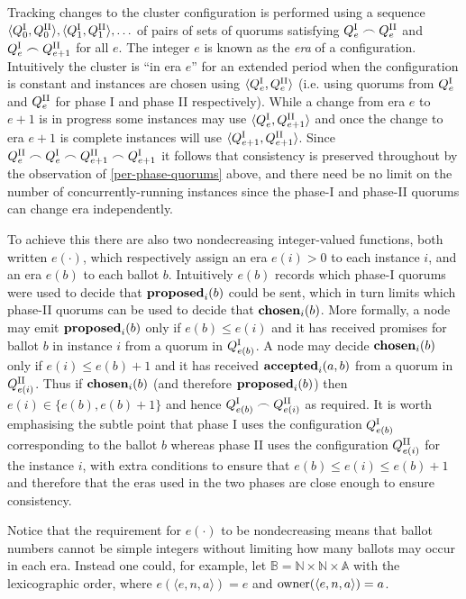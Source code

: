 \documentclass[journal]{IEEEtran}
\begin{document}
Tracking changes to the cluster configuration is performed using a sequence
$\langle {Q}^\textrm{I}_{0}, {Q}^\textrm{II}_{0} \rangle, \langle {Q}^\textrm{I}_{1}, {Q}^\textrm{II}_{1} \rangle, \ldots$ of
pairs of sets of quorums satisfying ${Q}^\textrm{I}_{e} \frown {Q}^\textrm{II}_{e}$ and ${Q}^\textrm{I}_{e} \frown
{Q}^\textrm{II}_{e+1}$ for all $e$. The integer $e$ is known as the \textit{era} of a
configuration. Intuitively the cluster is ``in era $e$'' for an extended period
when the configuration is constant and instances are chosen using $\langle
{Q}^\textrm{I}_{e}, {Q}^\textrm{II}_{e}\rangle$ (i.e. using quorums from ${Q}^\textrm{I}_{e}$ and ${Q}^\textrm{II}_{e}$ for
phase I and phase II respectively). While a change from era $e$ to $e+1$ is in
progress some instances may use $\langle {Q}^\textrm{I}_{e}, {Q}^\textrm{II}_{e+1} \rangle$ and once
the change to era $e+1$ is complete instances will use $\langle {Q}^\textrm{I}_{e+1},
{Q}^\textrm{II}_{e+1} \rangle$. Since ${Q}^\textrm{II}_{e} \frown {Q}^\textrm{I}_{e} \frown {Q}^\textrm{II}_{e+1} \frown
{Q}^\textrm{I}_{e+1}$ it follows that consistency is preserved throughout by the
observation of \ref{per-phase-quorums} above, and there need be no limit on the
number of concurrently-running instances since the phase-I and phase-II quorums
can change era independently.

To achieve this there are also two nondecreasing integer-valued functions, both
written $e(\cdot)$, which respectively assign an era $e(i) > 0$ to each
instance $i$, and an era $e(b)$ to each ballot $b$. Intuitively $e(b)$ records
which phase-I quorums were used to decide that $\mathbf{proposed}_{i}(b)$ could be sent,
which in turn limits which phase-II quorums can be used to decide that
$\mathbf{chosen}_{i}(b)$. More formally, a node may emit $\mathbf{proposed}_{i}(b)$ only if $e(b) \le
e(i)$ and it has received promises for ballot $b$ in instance $i$ from a quorum
in ${Q}^\textrm{I}_{e(b)}$. A node may decide $\mathbf{chosen}_{i}(b)$ only if ${e(i) \le e(b)+1}$
and it has received $\mathbf{accepted}_{i}(a,b)$ from a quorum in ${Q}^\textrm{II}_{e(i)}$.  Thus if
$\mathbf{chosen}_{i}(b)$ (and therefore $\mathbf{proposed}_{i}(b)$) then ${e(i) \in \{ e(b), e(b)+1
\}}$ and hence ${Q}^\textrm{I}_{e(b)} \frown {Q}^\textrm{II}_{e(i)}$ as required.  It is worth
emphasising the subtle point that phase I uses the configuration ${Q}^\textrm{I}_{e(b)}$
corresponding to the ballot $b$ whereas phase II uses the configuration
${Q}^\textrm{II}_{e(i)}$ for the instance $i$, with extra conditions to ensure that $e(b)
\le e(i) \le e(b) + 1$ and therefore that the eras used in the two phases are
close enough to ensure consistency.

Notice that the requirement for $e(\cdot)$ to be nondecreasing means that
ballot numbers cannot be simple integers without limiting how many ballots may
occur in each era. Instead one could, for example, let $\mathbb B = \mathbb N
\times \mathbb N \times \mathbb A$ with the lexicographic order, where
$e(\langle e, n, a\rangle) = e$ and $\mathrm{owner}(\langle e, n, a \rangle) = a$.
\end{document}
